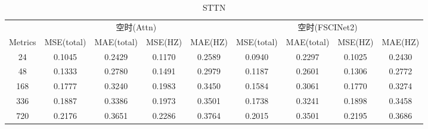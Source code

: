 \documentclass[twoside,a4paper]{article}
\begin{document}
\begin{CJK*}{UTF8}{gkai}
\begin{table}[H]
  \centering
  \caption{STTN}
  \begin{tabular}{c | c c c c | c c c c}
    \hline
    & \multicolumn{4}{c|}{空时(Attn)}& \multicolumn{4}{c}{空时(FSCINet2)}\\
    Metrics & MSE(total) & MAE(total) & MSE(HZ) & MAE(HZ) & MSE(total) & MAE(total) & MSE(HZ) & MAE(HZ) \\
    \hline
     24  & 0.1045 & 0.2429 & 0.1170 & 0.2589 & 0.0940 & 0.2297 & 0.1025 & 0.2430 \\
     48  & 0.1333 & 0.2780 & 0.1491 & 0.2979 & 0.1187 & 0.2601 & 0.1306 & 0.2772 \\
     168 & 0.1777 & 0.3240 & 0.1983 & 0.3450 & 0.1584 & 0.3061 & 0.1770 & 0.3274 \\
     336 & 0.1887 & 0.3386 & 0.1973 & 0.3501 & 0.1738 & 0.3241 & 0.1898 & 0.3458 \\
     720 & 0.2176 & 0.3651 & 0.2286 & 0.3764 & 0.2015 & 0.3501 & 0.2195 & 0.3686 \\
    \hline%
  \end{tabular}
  \label{tab:pro_pro}
\end{table}



\end{CJK*}
\end{document}
